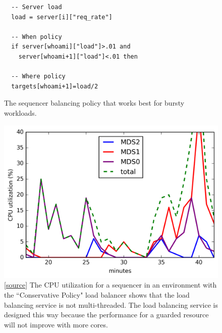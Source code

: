 \documentclass[preprint]{sigplanconf-eurosys}
\begin{document}
\begin{figure}[]
\begin{lstlisting}
  -- Server load
  load = server[i]["req_rate"]
  
  -- When policy
  if server[whoami]["load"]>.01 and 
    server[whoami+1]["load"]<.01 then
    
  -- Where policy
  targets[whoami+1]=load/2
\end{lstlisting}
\caption{The sequencer balancing policy that works best for bursty workloads. 
\label{listing:greedy-spill}}
\end{figure}

\begin{figure}[t!]
\centering
\includegraphics{figures/mantle-cpu-utilization.png}
\caption{[\href{https://github.com/double-blind-submitter/osdi16}{source}] The
CPU utilization for a sequencer in an environment with the ``Conservative
Policy" load balancer shows that the load balancing service is not
multi-threaded. The load balancing service is designed this way because the
performance for a guarded resource will not improve with more cores.}
\label{fig:mantle-cpu-utilization}
\end{figure}
\end{document}
